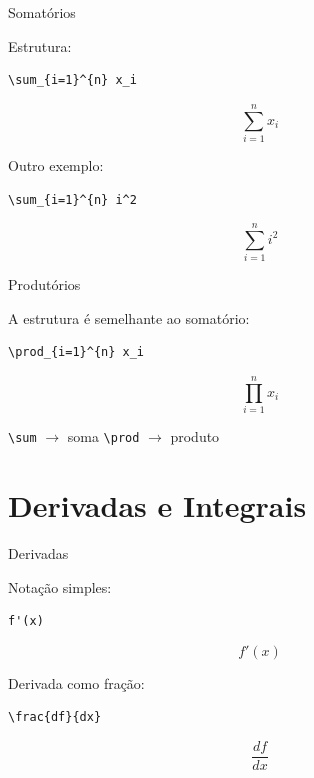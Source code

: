 \documentclass[aspectratio=169,xcolor=dvipsnames]{beamer}
\begin{document}
\begin{frame}[fragile]{Somatórios}

    Estrutura:

\begin{lstlisting}
\sum_{i=1}^{n} x_i
\end{lstlisting}

    \[
        \sum_{i=1}^{n}x_i
    \]

    Outro exemplo:

\begin{lstlisting}
\sum_{i=1}^{n} i^2
\end{lstlisting}

    \[
        \sum_{i=1}^{n}i^2
    \]

\end{frame}

\begin{frame}[fragile]{Produtórios}

    A estrutura é semelhante ao somatório:

\begin{lstlisting}
\prod_{i=1}^{n} x_i
\end{lstlisting}

    \[
        \prod_{i=1}^{n}x_i
    \]

    \begin{center}
        \texttt{\textbackslash sum} $\rightarrow$ soma
        \qquad
        \texttt{\textbackslash prod} $\rightarrow$ produto
    \end{center}

\end{frame}


\section{Derivadas e Integrais}

\begin{frame}[fragile]{Derivadas}

    Notação simples:

\begin{lstlisting}
f'(x)
\end{lstlisting}

    \[
        f'(x)
    \]

    Derivada como fração:

\begin{lstlisting}
\frac{df}{dx}
\end{lstlisting}

    \[
        \frac{df}{dx}
    \]

\end{frame}
\end{document}
